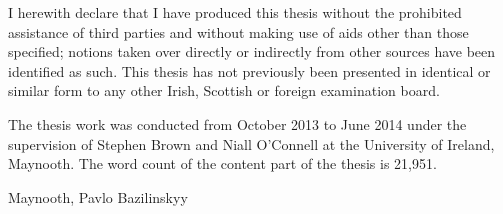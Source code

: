 


\begin{declaration}        %

I herewith declare that I have produced this thesis without the prohibited assistance of third parties and without making use of aids other than those specified; notions taken over directly or indirectly from other sources have been identified as such. This thesis has not previously been presented in identical or similar form to any other Irish, Scottish or foreign examination board.

The thesis work was conducted from October 2013 to June 2014 under the supervision of Stephen Brown and Niall O'Connell at the University of Ireland, Maynooth. The word count of the content part of the thesis is 21,951.

\vspace{10mm}

Maynooth, Pavlo Bazilinskyy


\end{declaration}


